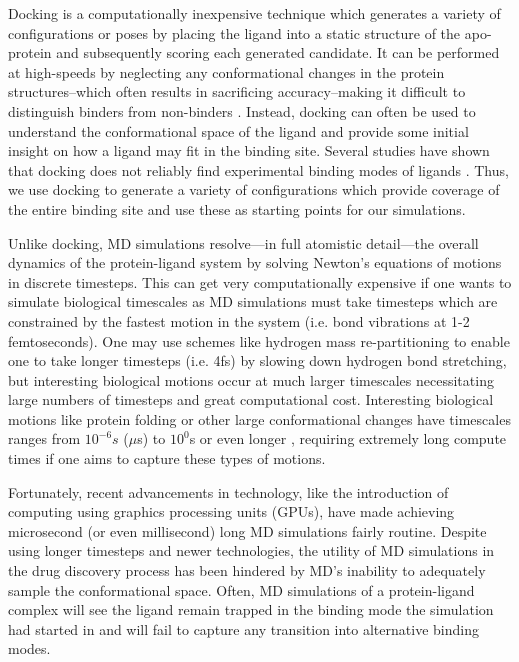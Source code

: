 Docking is a computationally inexpensive technique which generates a variety of configurations or poses by placing the ligand into a static structure of the apo-protein and subsequently scoring each generated candidate.
It can be performed at high-speeds by neglecting any conformational changes in the protein structures--which often results in sacrificing accuracy--making it difficult to distinguish binders from non-binders \cite{lape_comparison_2010, plewczynski_can_2011, ramirez_is_2018, gohlke_knowledge-based_2000, warren_critical_2006}.
Instead, docking can often be used to understand the conformational space of the ligand and provide some initial insight on how a ligand may fit in the binding site.
Several studies have shown that docking does not reliably find experimental binding modes of ligands \cite{guedes_receptorligand_2013, warren_critical_2006}.
Thus, we use docking to generate a variety of configurations which provide coverage of the entire binding site and use these as starting points for our simulations.

Unlike docking, MD simulations resolve---in full atomistic detail---the overall dynamics of the protein-ligand system by solving Newton's equations of motions in discrete timesteps\cite{hospital_molecular_2015, hollingsworth_molecular_2018}.
This can get very computationally expensive if one wants to simulate biological timescales as MD simulations must take timesteps which are constrained by the fastest motion in the system (i.e. bond vibrations at 1-2 femtoseconds).
One may use schemes like hydrogen mass re-partitioning \cite{hmass_repartition} to enable one to take longer timesteps (i.e. 4fs) by slowing down hydrogen bond stretching, but interesting biological motions occur at much larger timescales necessitating large numbers of timesteps and great computational cost.
Interesting biological motions like protein folding or other large conformational changes have timescales ranges from \(10^{-6}s\) (\(\mu\)s) to \(10^{0}\)s or even longer \cite{han_protein_2014}, requiring extremely long compute times if one aims to capture these types of motions.

Fortunately, recent advancements in technology, like the introduction of computing using graphics processing units (GPUs), have made achieving microsecond (or even millisecond) long MD simulations fairly routine.
Despite using longer timesteps and newer technologies, the utility of MD simulations in the drug discovery process has been hindered by MD's inability to adequately sample the conformational space.
Often, MD simulations of a protein-ligand complex will see the ligand remain trapped in the binding mode the simulation had started in and will fail to capture any transition into alternative binding modes.

